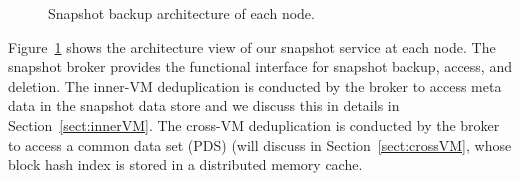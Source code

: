 \begin{figure}[htbp]
  \centering
  \caption{Snapshot backup architecture of each node.}
  \label{fig:arch}
\end{figure}

Figure~\ref{fig:arch} shows the architecture view of our snapshot service
at each node. The snapshot broker provides the functional interface for  snapshot backup, access, and deletion.
The inner-VM  deduplication is conducted by the broker to access meta data in the snapshot data store
and we discuss this in details in Section~\ref{sect:innerVM}.
The cross-VM deduplication is conducted by the broker to access 
a common data set (PDS) (will discuss in Section~\ref{sect:crossVM},
whose block hash index is stored in a distributed memory cache. 

%


